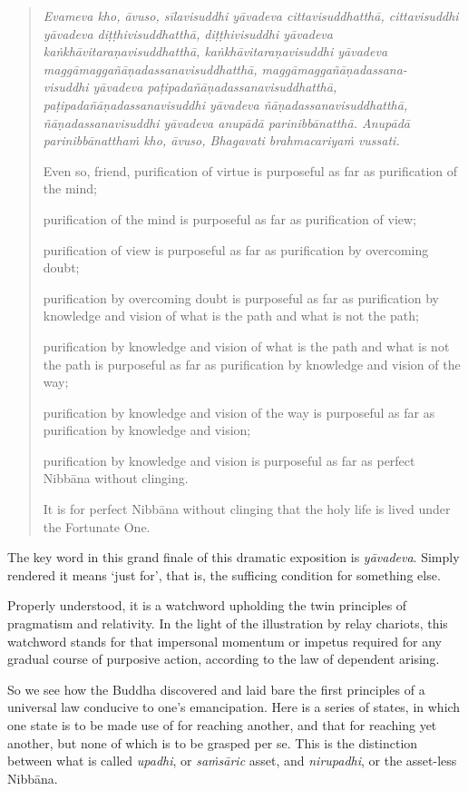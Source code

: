 \enlargethispage{\baselineskip}

\begin{quote}
\emph{Evameva kho, āvuso, sīlavisuddhi yāvadeva cittavisuddhatthā,
cittavisuddhi yāvadeva diṭṭhivisuddhatthā,
diṭṭhivisuddhi yāvadeva kaṅkhāvitaraṇavisuddhatthā,
kaṅkhāvitaraṇavisuddhi yāvadeva maggāmaggañāṇadassanavisuddhatthā,
maggāmaggañāṇadassana-\\ visuddhi yāvadeva paṭipadañāṇadassanavisuddhatthā,
paṭipadañāṇadassanavisuddhi yāvadeva ñāṇadassanavisuddhatthā,
ñāṇadassanavisuddhi yāvadeva anupādā parinibbānatthā.
Anupādā parinibbānatthaṁ kho, āvuso, Bhagavati brahmacariyaṁ vussati.}

Even so, friend, purification of virtue is purposeful as far as purification of the mind;

purification of the mind is purposeful as far as purification of view;

purification of view is purposeful as far as purification by overcoming doubt;

purification by overcoming doubt is purposeful as far as purification by knowledge and vision of what is the path and what is not the path;

purification by knowledge and vision of what is the path and what is not the path is purposeful as far as purification by knowledge and vision of the way;

purification by knowledge and vision of the way is purposeful as far as purification by knowledge and vision;

purification by knowledge and vision is purposeful as far as perfect Nibbāna without clinging.

It is for perfect Nibbāna without clinging that the holy life is lived under the Fortunate One.
\end{quote}

The key word in this grand finale of this dramatic exposition is \emph{yāvadeva}. Simply rendered it means `just for', that is, the sufficing condition for something else.

Properly understood, it is a watchword upholding the twin principles of pragmatism and relativity. In the light of the illustration by relay chariots, this watchword stands for that impersonal momentum or impetus required for any gradual course of purposive action, according to the law of dependent arising.

So we see how the Buddha discovered and laid bare the first principles of a universal law conducive to one's emancipation. Here is a series of states, in which one state is to be made use of for reaching another, and that for reaching yet another, but none of which is to be grasped per se. This is the distinction between what is called \emph{upadhi}, or \emph{saṁsāric} asset, and \emph{nirupadhi}, or the asset-less Nibbāna.

